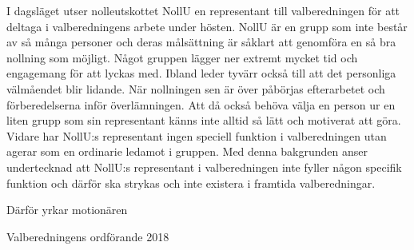 \documentclass[../_main/handlingar.tex]{subfiles}
\begin{document}

I dagsläget utser nolleutskottet NollU en representant till valberedningen för att deltaga i valberedningens arbete under hösten. NollU är en grupp som inte består av så många personer och deras målsättning är såklart att genomföra en så bra nollning som möjligt. Något gruppen lägger ner extremt mycket tid och engagemang för att lyckas med. Ibland leder tyvärr också till att det personliga välmåendet blir lidande. När nollningen sen är över påbörjas efterarbetet och förberedelserna inför överlämningen. Att då också behöva välja en person ur en liten grupp som sin representant känns inte alltid så lätt och motiverat att göra. Vidare har NollU:s representant ingen speciell funktion i valberedningen utan agerar som en ordinarie ledamot i gruppen. Med denna bakgrunden anser undertecknad att NollU:s representant i valberedningen inte fyller någon specifik funktion och därför ska strykas och inte existera i framtida valberedningar. 


Därför yrkar motionären 

\begin{signatures}{1}
    \mvh
    \signature{Pontus Landgren}{Valberedningens ordförande 2018}
\end{signatures}
\end{document}
